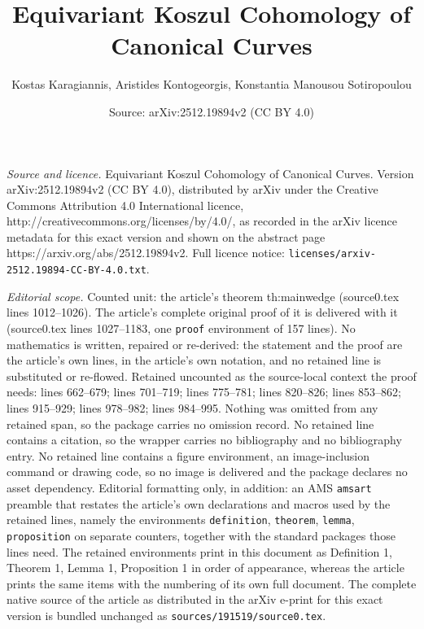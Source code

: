 \documentclass[10pt,a4paper]{amsart}
\title{Equivariant Koszul Cohomology of Canonical Curves}
\author{Kostas Karagiannis, Aristides Kontogeorgis, Konstantia Manousou Sotiropoulou}
\date{Source: arXiv:2512.19894v2 (CC BY 4.0)}
\begin{document}
\maketitle

\noindent\emph{Source and licence.} Equivariant Koszul Cohomology of Canonical Curves. Version arXiv:2512.19894v2 (CC BY 4.0), distributed by arXiv under the Creative Commons Attribution 4.0 International licence, http://creativecommons.org/licenses/by/4.0/, as recorded in the arXiv licence metadata for this exact version and shown on the abstract page https://arxiv.org/abs/2512.19894v2. Full licence notice: \texttt{licenses/arxiv-2512.19894-CC-BY-4.0.txt}.\par\smallskip

\noindent\textit{Editorial scope.} Counted unit: the article's theorem th:mainwedge (source0.tex lines 1012--1026). The article's complete original proof of it is delivered with it (source0.tex lines 1027--1183, one \texttt{proof} environment of 157 lines). No mathematics is written, repaired or re-derived: the statement and the proof are the article's own lines, in the article's own notation, and no retained line is substituted or re-flowed.  Retained uncounted as the source-local context the proof needs: lines 662--679; lines 701--719; lines 775--781; lines 820--826; lines 853--862; lines 915--929; lines 978--982; lines 984--995.  Nothing was omitted from any retained span, so the package carries no omission record.  No retained line contains a citation, so the wrapper carries no bibliography and no bibliography entry.  No retained line contains a figure environment, an image-inclusion command or drawing code, so no image is delivered and the package declares no asset dependency.  Editorial formatting only, in addition: an AMS \texttt{amsart} preamble that restates the article's own declarations and macros used by the retained lines, namely the environments \texttt{definition}, \texttt{theorem}, \texttt{lemma}, \texttt{proposition} on separate counters, together with the standard packages those lines need.  The retained environments print in this document as Definition 1, Theorem 1, Lemma 1, Proposition 1 in order of appearance, whereas the article prints the same items with the numbering of its own full document.  The complete native source of the article as distributed in the arXiv e-print for this exact version is bundled unchanged as \texttt{sources/191519/source0.tex}.
\end{document}
